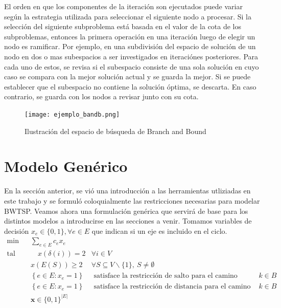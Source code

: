 \documentclass[10pt, a4paper]{article}
\theoremstyle{definition}
\begin{document}
 El orden en que los componentes de la iteración son ejecutados puede variar según la estrategia utilizada para seleccionar el siguiente nodo a procesar.
 Si la selección del siguiente subproblema está basada en el valor de la cota de los subproblemas, entonces la primera operación en una iteración luego de elegir un nodo es ramificar.
 Por ejemplo, en una subdivisión del espacio de solución de un nodo en dos o mas subespacios a ser investigados en iteraciónes posteriores.
 Para cada uno de estos, se revisa si el subespacio consiste de una sola solución en cuyo caso se compara con la mejor solución actual y se guarda la mejor.
 Si se puede establecer que el subespacio no contiene la solución óptima, se descarta. En caso contrario, se guarda con los nodos a revisar junto con su cota.
 
 
 \begin{figure}[H]
  \centering
  \texttt{[image: ejemplo\_bandb.png]}
  \caption{Ilustración del espacio de búsqueda de Branch and Bound}
  \label{fig:ejemplo_bandb}
\end{figure}

\section{Modelo Genérico}

En la sección anterior, se vió una introducción a las herramientas utliziadas en este trabajo y se formuló coloquialmente las restricciones necesarias para modelar BWTSP. Veamos ahora una formulación genérica que servirá de base para los distintos modelos a introducirse en las secciones a venir.
Tomamos variables de decisión $x_e \in \{0,1\}, \forall e \in E$ que indican si un eje es incluido en el ciclo.
\begin{align} 
	\min & \sum_{e \in E} c_{e} x_{e} & \label{eq:1} \\
	\text {tal que} & \quad x(\delta(i))=2 & \forall i \in V \label{eq:2} \\
	& x(E(S)) \geq 2 & \forall S \subseteq V \backslash\{1\},\ S \neq \emptyset \label{eq:3} \\
	& \left\{e \in E : x_{e}=1\right\} & \text { satisface la restricción de salto para el camino después de cada } k \in B \label{eq:4} \\
	& \left\{e \in E : x_{e}=1\right\} & \text { satisface la restricción de distancia para el camino después de cada } k \in B \label{eq:5} \\
	& \mathbf{x} \in\{0,1\}^{|E|} & \label{eq:6}
\end{align}
\end{document}
